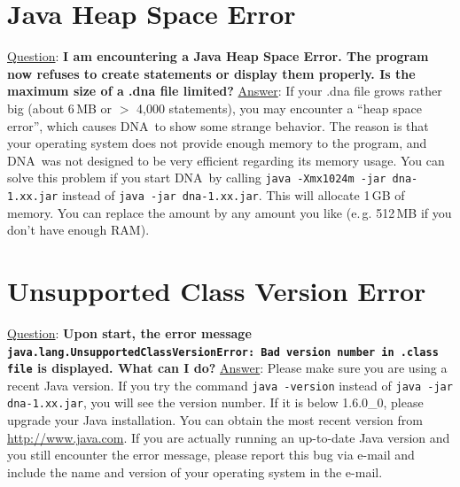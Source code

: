 \documentclass[12pt,a4paper]{scrreprt}
\newcommand{\dnashort}{\textsc{DNA}}
\newcommand{\code}[1]{\texttt{#1}}
\begin{document}
\section{Java Heap Space Error}
\underline{Question}: \textbf{I am encountering a Java Heap Space Error. The program now refuses to create statements or display them properly. Is the maximum size of a .dna file limited?}
\vspace{0.3cm} \newline
\underline{Answer}: If your .dna file grows rather big (about 6\,MB or $>$ 4,000 statements), you may encounter a ``heap space error'', which causes \dnashort\ to show some strange behavior. The reason is that your operating system does not provide enough memory to the program, and \dnashort\ was not designed to be very efficient regarding its memory usage. You can solve this problem if you start \dnashort\ by calling \code{java -Xmx1024m -jar dna-1.xx.jar} instead of \code{java -jar dna-1.xx.jar}. This will allocate 1\,GB of memory. You can replace the amount by any amount you like (e.\,g. 512\,MB if you don't have enough RAM).

\section{Unsupported Class Version Error}\label{faq:unsupportedversion}
\underline{Question}: \textbf{Upon start, the error message \code{java.lang.Un\-sup\-port\-ed\-Class\-Ver\-sion\-Er\-ror: Bad version number in .class file} is displayed. What can I do?}
\vspace{0.3cm} \newline
\underline{Answer}: Please make sure you are using a recent Java version. If you try the command \code{java -version} instead of \code{java -jar dna-1.xx.jar}, you will see the version number. If it is below 1.6.0\_0, please upgrade your Java installation. You can obtain the most recent version from \url{http://www.java.com}. If you are actually running an up-to-date Java version and you still encounter the error message, please report this bug via e-mail and include the name and version of your operating system in the e-mail.
\end{document}
